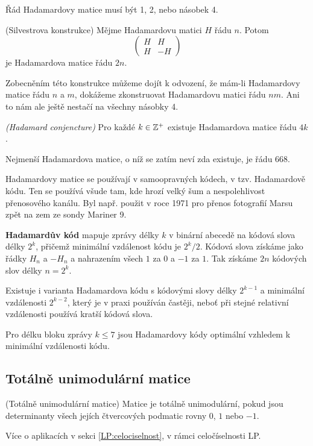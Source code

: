 \tv Řád Hadamardovy matice musí být 1, 2, nebo násobek 4.

\alg (Silvestrova konstrukce) Mějme Hadamardovu matici $H$ řádu $n$. Potom 
$$\begin{pmatrix}
H & H \\
H & -H
\end{pmatrix}$$
je Hadamardova matice řádu $2n$.

Zobecněním této konstrukce můžeme dojít k odvození, že mám-li Hadamardovy matice
řádu $n$ a $m$, dokážeme zkonstruovat Hadamardovu matici řádu $nm$. Ani to nám
ale ještě nestačí na všechny násobky 4.

\conj \emph{(Hadamard conjencture)} Pro každé $k \in \mathbb{Z}^+$ existuje Hadamardova
matice řádu $4k$.

\smallskip
Nejmenší Hadamardova matice, o níž se zatím neví zda existuje, je řádu 668.

\smallskip
Hadamardovy matice se používají v samoopravných kódech, v tzv. Hadamardově kódu.
Ten se používá všude tam, kde hrozí velký šum a nespolehlivost přenosového
kanálu. Byl např. použit v roce 1971 pro přenos fotografií Marsu zpět na zem ze
sondy Mariner 9.

\smallskip\noindent\textbf{Hadamardův kód} mapuje zprávy délky $k$ v binární
abecedě na kódová slova délky $2^k$, přičemž minimální vzdálenost kódu je
$2^k/2$. Kódová slova získáme jako řádky $H_n$ a $-H_n$ a nahrazením všech
$1$ za $0$ a $-1$ za $1$. Tak získáme $2n$ kódových slov délky $n = 2^k$.

Existuje i varianta Hadamardova kódu s kódovými slovy délky $2^{k-1}$ a
minimální vzdálenosti $2^{k-2}$, který je v praxi používán častěji, neboť při
stejné relativní vzdálenosti používá kratší kódová slova.

\tv Pro délku bloku zprávy $k \le 7$ jsou Hadamardovy kódy optimální vzhledem k
minimální vzdálenosti kódu.

\subsection{Totálně unimodulární matice}

\df (Totálně unimodulární matice) Matice je totálně unimodulární, pokud jsou
determinanty všech jejích čtvercových podmatic rovny $0$, $1$ nebo $-1$.

Více o aplikacích v sekci \ref{LP:celociselnost}, v rámci celočíselnosti LP.
